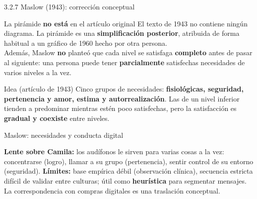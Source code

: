 \documentclass[aspectratio=169,xcolor=dvipsnames]{beamer}
\begin{document}
\begin{frame}{3.2.7 Maslow (1943): corrección conceptual}
\begin{alertblock}{La pirámide \textbf{no está} en el artículo original}
  \small El texto de 1943 no contiene ningún diagrama. La pirámide es una \textbf{simplificación posterior}, atribuida de forma habitual a un gráfico de 1960 hecho por otra persona.\\[3pt]
  Además, Maslow \textbf{no} planteó que cada nivel se satisfaga \textbf{completo} antes de pasar al siguiente: una persona puede tener \textbf{parcialmente} satisfechas necesidades de varios niveles a la vez.
\end{alertblock}
\begin{block}{Idea (artículo de 1943)}
  \small Cinco grupos de necesidades: \textbf{fisiológicas, seguridad, pertenencia y amor, estima y autorrealización}. Las de un nivel inferior tienden a predominar mientras estén poco satisfechas, pero la satisfacción es \textbf{gradual y coexiste} entre niveles.
\end{block}
\end{frame}

\begin{frame}{Maslow: necesidades y conducta digital}
\scriptsize
\begin{center}
\end{center}
\vspace{-2pt}
{\tiny \textbf{Lente sobre Camila:} los audífonos le sirven para varias cosas a la vez: concentrarse (logro), llamar a su grupo (pertenencia), sentir control de su entorno (seguridad). \textbf{Límites:} base empírica débil (observación clínica), secuencia estricta difícil de validar entre culturas; útil como \textbf{heurística} para segmentar mensajes. La correspondencia con compras digitales es una traslación conceptual.}
\end{frame}
\end{document}

